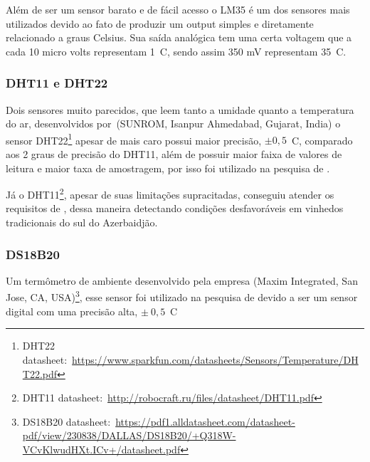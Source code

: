 \documentclass[
article,			%
12pt,				%
oneside,			%
a4paper,			%
english,			%
brazil,				%
sumario=tradicional
]{abntex2}
\begin{document}
Além de ser um sensor barato e de fácil acesso o LM35 é um dos sensores mais utilizados devido ao fato de produzir um output simples e diretamente relacionado a graus Celsius. Sua saída analógica tem uma certa voltagem que a cada 10 micro volts representam 1\textdegree~C, sendo assim 350 mV representam 35\textdegree~C.



\subsubsection{DHT11 e DHT22}\label{DHT11 e DHT22}
Dois sensores muito parecidos, que leem tanto a umidade quanto a temperatura do ar, desenvolvidos por~(SUNROM, Isanpur Ahmedabad, Gujarat, India) o sensor DHT22\footnote{DHT22 datasheet:~\url{https://www.sparkfun.com/datasheets/Sensors/Temperature/DHT22.pdf}} apesar de mais caro possui maior precisão, $\pm 0,5$\textdegree~C, comparado aos 2 graus de precisão do DHT11, além de possuir maior faixa de valores de leitura e maior taxa de amostragem, por isso foi utilizado na pesquisa de \citeauthor{7}.

Já o DHT11\footnote{DHT11 datasheet:~\url{http://robocraft.ru/files/datasheet/DHT11.pdf}}, apesar de suas limitações supracitadas, conseguiu atender os requisitos de \citeauthor{13}, dessa maneira detectando condições desfavoráveis em vinhedos tradicionais do sul do Azerbaidjão.

\subsubsection{DS18B20}\label{DS18B20}
Um termômetro de ambiente desenvolvido pela empresa (Maxim Integrated, San Jose, CA, USA)\footnote{DS18B20 datasheet:~\url{https://pdf1.alldatasheet.com/datasheet-pdf/view/230838/DALLAS/DS18B20/+Q318W-VCvKlwudHXt.ICv+/datasheet.pdf}}, esse sensor foi utilizado na pesquisa de \citeauthor{9} devido a ser um sensor digital com uma precisão alta, $\pm~0,5$\textdegree~C
\end{document}
